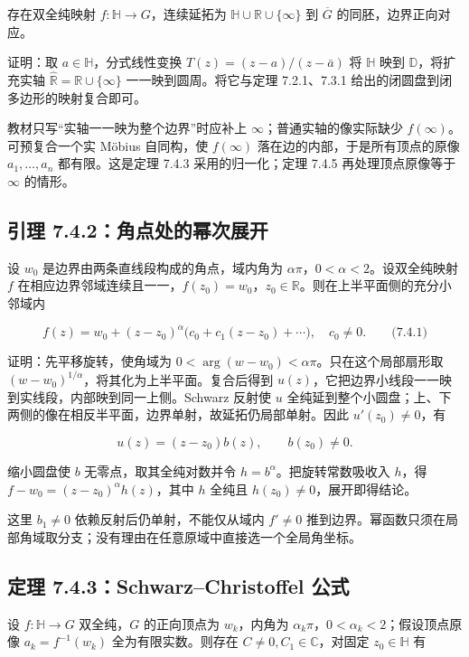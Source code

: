 \documentclass[11pt,a4paper]{article}
\begin{document}
存在双全纯映射 \(f:\mathbb H\to G\)，连续延拓为
\(\mathbb H\cup\mathbb R\cup\{\infty\}\) 到 \(\overline G\)
的同胚，边界正向对应。

证明：取 \(a\in\mathbb H\)，分式线性变换 \(T(z)=(z-a)/(z-\bar a)\) 将
\(\mathbb H\) 映到 \(\mathbb D\)，将扩充实轴
\(\widehat{\mathbb R}=\mathbb R\cup\{\infty\}\) 一一映到圆周。将它与定理
7.2.1、7.3.1 给出的闭圆盘到闭多边形的映射复合即可。

教材只写``实轴一一映为整个边界''时应补上
\(\infty\)；普通实轴的像实际缺少 \(f(\infty)\)。可预复合一个实 Möbius
自同构，使 \(f(\infty)\) 落在边的内部，于是所有顶点的原像
\(a_1,\ldots,a_n\) 都有限。这是定理 7.4.3 采用的归一化；定理 7.4.5
再处理顶点原像等于 \(\infty\) 的情形。

\subsection{引理 7.4.2：角点处的幂次展开}\label{ch07-s4-heading-3}

设 \(w_0\) 是边界由两条直线段构成的角点，域内角为
\(\alpha\pi\)，\(0<\alpha<2\)。设双全纯映射 \(f\)
在相应边界邻域连续且一一，\(f(z_0)=w_0\)，\(z_0\in\mathbb R\)。则在上半平面侧的充分小邻域内

\[
f(z)=w_0+(z-z_0)^\alpha\bigl(c_0+c_1(z-z_0)+\cdots\bigr),\quad c_0\ne0.
\qquad\text{(7.4.1)}
\]

证明：先平移旋转，使角域为
\(0<\arg(w-w_0)<\alpha\pi\)。只在这个局部扇形取
\((w-w_0)^{1/\alpha}\)，将其化为上半平面。复合后得到
\(u(z)\)，它把边界小线段一一映到实线段，内部映到同一上侧。Schwarz 反射使
\(u\)
全纯延到整个小圆盘；上、下两侧的像在相反半平面，边界单射，故延拓仍局部单射。因此
\(u'(z_0)\ne0\)，有

\[
u(z)=(z-z_0)b(z),\qquad b(z_0)\ne0.
\]

缩小圆盘使 \(b\) 无零点，取其全纯对数并令
\(h=b^\alpha\)。把旋转常数吸收入 \(h\)，得
\(f-w_0=(z-z_0)^\alpha h(z)\)，其中 \(h\) 全纯且
\(h(z_0)\ne0\)，展开即得结论。

这里 \(b_1\ne0\) 依赖反射后仍单射，不能仅从域内 \(f'\ne0\)
推到边界。幂函数只须在局部角域取分支；没有理由在任意原域中直接选一个全局角坐标。

\subsection{定理 7.4.3：Schwarz--Christoffel 公式}\label{ch07-s4-heading-4}

设 \(f:\mathbb H\to G\) 双全纯，\(G\) 的正向顶点为 \(w_k\)，内角为
\(\alpha_k\pi\)，\(0<\alpha_k<2\)；假设顶点原像 \(a_k=f^{-1}(w_k)\)
全为有限实数。则存在 \(C\ne0,C_1\in\mathbb C\)，对固定
\(z_0\in\mathbb H\) 有
\end{document}
